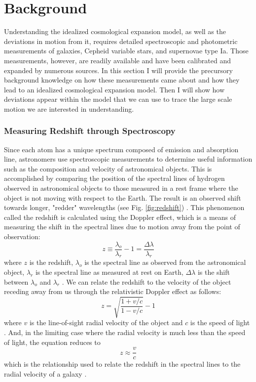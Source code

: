 \chapter{Background}


Understanding the idealized cosmological expansion model, as well as the deviations in motion from it, requires detailed spectroscopic and photometric measurements of galaxies, Cepheid variable stars, and supernovae type Ia. Those measurements, however, are readily available and have been calibrated and expanded by numerous sources. In this section I will provide the precursory background knowledge on how these measurements came about and how they lead to an idealized cosmological expansion model. Then I will show how deviations appear within the model that we can use to trace the large scale motion we are interested in understanding.


\subsection{Measuring Redshift through Spectroscopy}

Since each atom has a unique spectrum composed of emission and absorption line, astronomers use spectroscopic measurements to determine useful information such as the composition and velocity of astronomical objects. This is accomplished by comparing the position of the spectral lines of hydrogen observed in astronomical objects to those measured in a rest frame where the object is not moving with respect to the Earth. The result is an observed shift towards longer, "redder" wavelengths (see Fig. \ref{fig:redshift}) \cite{SpectralRedshift}. This phenomenon called the redshift is calculated using the Doppler effect, which is a means of measuring the shift in the spectral lines due to motion away from the point of observation:
%
\begin{equation}\label{ds}
z \equiv \frac{\lambda_{o}}{\lambda_{r}} -1 = \frac{\Delta \lambda}{\lambda_{r}}
\end{equation}
%
where $z$ is the redshift, $\lambda_{o}$ is the spectral line as observed from the astronomical object, $\lambda_{r}$ is the spectral line as measured at rest on Earth, $\Delta \lambda$ is the shift between $\lambda_{o}$ and $\lambda_{r}$ \cite{Hogg1999:DistanceMeas+GenRef}\cite{moore2012general}. We can relate the redshift to the velocity of the object receding away from us through the relativistic Doppler effect as follows:
%
\begin{equation}\label{rds}
z = \sqrt{\frac{1+v/c}{1-v/c}} - 1
\end{equation}
%
where $v$ is the line-of-sight radial velocity of the object and $c$ is the speed of light \cite{Hogg1999:DistanceMeas+GenRef}\cite{Kirshner2004:HubbleDiagram}\cite{moore2012general}. And, in the limiting case where the radial velocity is much less than the speed of light, the equation reduces to
%
\begin{equation}\label{redshift-radialvelo}
z \approx \frac{v}{c}
\end{equation}
%
which is the relationship used to relate the redshift in the spectral lines to the radial velocity of a galaxy \cite{Hogg1999:DistanceMeas+GenRef}\cite{moore2012general}.


